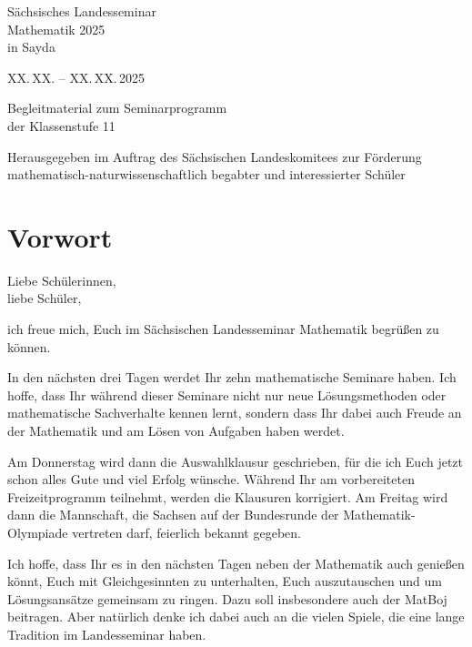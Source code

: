 \documentclass[a4paper, 12pt]{article}
\begin{document}
	\begin{titlepage}
		\centering\sffamily\Huge\bfseries
		\vspace*{0.75em}
		
		Sächsisches Landesseminar \\
		Mathematik 2025 \\
		\textmd{in Sayda} \\
		
		\vspace{1.75em}
		
		\textmd{\large XX.\,XX. -- XX.\,XX.\,2025} \\
		
		\vspace{6em}
		
		Begleitmaterial zum Seminarprogramm\\[.6\baselineskip]
		der Klassenstufe 11\\
		
		\vfill
		
		\raggedright\normalfont\normalsize
		Herausgegeben im Auftrag des Sächsischen Landeskomitees zur Förderung \\
		mathematisch-naturwissenschaftlich begabter und interessierter Schüler
	\end{titlepage}
	\setcounter{page}{2}
	
	\section*{Vorwort}
	
	Liebe Schülerinnen,\\
	liebe Schüler,
	
	ich freue mich, Euch im Sächsischen Landesseminar Mathematik begrüßen zu können.
	
	In den nächsten drei Tagen werdet Ihr zehn mathematische Seminare haben. Ich hoffe, dass Ihr während dieser Seminare nicht nur neue Lösungsmethoden oder mathematische Sachverhalte kennen lernt, sondern dass Ihr dabei auch Freude an der Mathematik und am Lösen von Aufgaben haben werdet.
	
	Am Donnerstag wird dann die Auswahlklausur geschrieben, für die ich Euch jetzt schon alles Gute und viel Erfolg wünsche. Während Ihr am vorbereiteten Freizeitprogramm teilnehmt, werden die Klausuren korrigiert. Am Freitag wird dann die Mannschaft, die Sachsen auf der Bundesrunde der Mathematik-Olympiade vertreten darf, feierlich bekannt gegeben.
	
	Ich hoffe, dass Ihr es in den nächsten Tagen neben der Mathematik auch genießen könnt, Euch mit Gleichgesinnten zu unterhalten, Euch auszutauschen und um Lösungsansätze gemeinsam zu ringen. Dazu soll insbesondere auch der MatBoj beitragen. Aber natürlich denke ich dabei auch an die vielen Spiele, die eine lange Tradition im Landesseminar haben.
	
\end{document}
